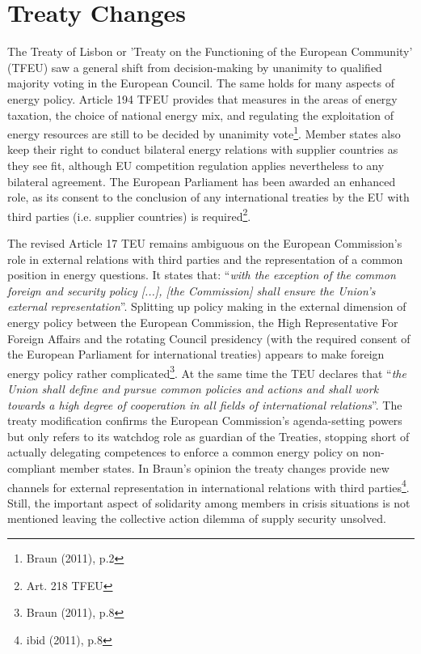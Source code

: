 \documentclass[11pt,a4paper,english]{scrreprt}
\begin{document}
\par


  \section{Treaty Changes}


The Treaty of Lisbon or 'Treaty on the Functioning of the European Community'
(TFEU) saw a general shift from decision-making by unanimity to qualified
majority voting in the European Council. The same holds for many aspects of
energy policy. Article 194 TFEU provides that measures in the areas of energy
taxation, the choice of national energy mix, and regulating the exploitation of
energy resources are still to be decided by unanimity vote\footnote{Braun
(2011), p.2}. Member states also keep their right to conduct bilateral
energy relations with supplier countries as they see fit, although EU
competition regulation applies nevertheless to any bilateral agreement. The
European Parliament has been awarded an enhanced role, as its consent to the
conclusion of any international treaties by the EU with third parties (i.e.
supplier countries) is required\footnote{Art. 218 TFEU}.\par

The revised Article 17 TEU remains ambiguous on the European Commission's role
in external relations with third parties and the representation of a common
position in energy questions. It states that: ``\textsl{with the exception of
the common foreign and security policy [...], [the Commission] shall ensure the
Union's external representation}''. Splitting up policy making in the external
dimension of energy policy between the European Commission, the High
Representative For Foreign Affairs and the rotating Council presidency (with the
required consent of the European Parliament for international treaties)
appears to make foreign energy policy rather complicated\footnote{Braun (2011),
p.8}. At the same time the TEU declares that ``\textsl{the Union shall define
and pursue common policies and actions and shall work towards a high degree of
cooperation in all fields of international relations}''. The treaty
modification confirms the European Commission's agenda-setting powers but only
refers to its watchdog role as guardian of the Treaties, stopping short of
actually delegating competences to enforce a common energy policy on
non-compliant member states. In Braun's opinion the treaty changes
provide new channels for external representation in international relations with
third parties\footnote{ibid (2011), p.8}. Still, the important aspect of
solidarity among members in crisis situations is not mentioned leaving the
collective action dilemma of supply security unsolved.\par
\end{document}
